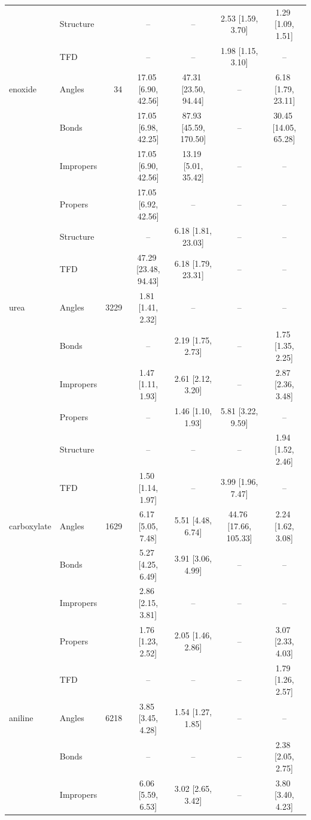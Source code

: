 \begin{longtable}[c]{ ll | r | c c c c}
     & Structure &  & -- & -- & 2.53\,\,[1.59, 3.70] & 1.29\,\,[1.09, 1.51] \\
     & TFD &  & -- & -- & 1.98\,\,[1.15, 3.10] & -- \\
    \hline
    enoxide & Angles & 34 & 17.05\,\,[6.90, 42.56] & 47.31\,\,[23.50, 94.44] & -- & 6.18\,\,[1.79, 23.11] \\
     & Bonds &  & 17.05\,\,[6.98, 42.25] & 87.93\,\,[45.59, 170.50] & -- & 30.45\,\,[14.05, 65.28] \\
     & Impropers &  & 17.05\,\,[6.90, 42.56] & 13.19\,\,[5.01, 35.42] & -- & -- \\
     & Propers &  & 17.05\,\,[6.92, 42.56] & -- & -- & -- \\
     & Structure &  & -- & 6.18\,\,[1.81, 23.03] & -- & -- \\
     & TFD &  & 47.29\,\,[23.48, 94.43] & 6.18\,\,[1.79, 23.31] & -- & -- \\
    \hline
    urea & Angles & 3229 & 1.81\,\,[1.41, 2.32] & -- & -- & -- \\
     & Bonds &  & -- & 2.19\,\,[1.75, 2.73] & -- & 1.75\,\,[1.35, 2.25] \\
     & Impropers &  & 1.47\,\,[1.11, 1.93] & 2.61\,\,[2.12, 3.20] & -- & 2.87\,\,[2.36, 3.48] \\
     & Propers &  & -- & 1.46\,\,[1.10, 1.93] & 5.81\,\,[3.22, 9.59] & -- \\
     & Structure &  & -- & -- & -- & 1.94\,\,[1.52, 2.46] \\
     & TFD &  & 1.50\,\,[1.14, 1.97] & -- & 3.99\,\,[1.96, 7.47] & -- \\
    \hline
    carboxylate & Angles & 1629 & 6.17\,\,[5.05, 7.48] & 5.51\,\,[4.48, 6.74] & 44.76\,\,[17.66, 105.33] & 2.24\,\,[1.62, 3.08] \\
     & Bonds &  & 5.27\,\,[4.25, 6.49] & 3.91\,\,[3.06, 4.99] & -- & -- \\
     & Impropers &  & 2.86\,\,[2.15, 3.81] & -- & -- & -- \\
     & Propers &  & 1.76\,\,[1.23, 2.52] & 2.05\,\,[1.46, 2.86] & -- & 3.07\,\,[2.33, 4.03] \\
     & TFD &  & -- & -- & -- & 1.79\,\,[1.26, 2.57] \\
    \hline
    aniline & Angles & 6218 & 3.85\,\,[3.45, 4.28] & 1.54\,\,[1.27, 1.85] & -- & -- \\
     & Bonds &  & -- & -- & -- & 2.38\,\,[2.05, 2.75] \\
     & Impropers &  & 6.06\,\,[5.59, 6.53] & 3.02\,\,[2.65, 3.42] & -- & 3.80\,\,[3.40, 4.23] \\

\end{longtable}
